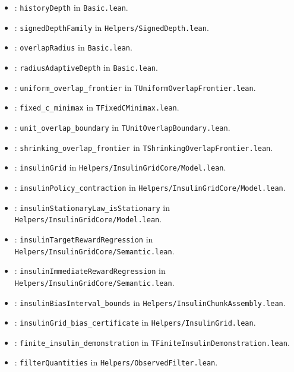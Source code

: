 \documentclass[11pt]{article}
\begin{document}
\begin{itemize}
\item {}: \texttt{historyDepth} in \texttt{Basic.lean}.
\item {}: \texttt{signedDepthFamily} in \texttt{Helpers/SignedDepth.lean}.
\item {}: \texttt{overlapRadius} in \texttt{Basic.lean}.
\item {}: \texttt{radiusAdaptiveDepth} in \texttt{Basic.lean}.
\item {}: \texttt{uniform\_overlap\_frontier} in \texttt{TUniformOverlapFrontier.lean}.
\item {}: \texttt{fixed\_c\_minimax} in \texttt{TFixedCMinimax.lean}.
\item {}: \texttt{unit\_overlap\_boundary} in \texttt{TUnitOverlapBoundary.lean}.
\item {}: \texttt{shrinking\_overlap\_frontier} in \texttt{TShrinkingOverlapFrontier.lean}.
\item {}: \texttt{insulinGrid} in \texttt{Helpers/InsulinGridCore/Model.lean}.
\item {}: \texttt{insulinPolicy\_contraction} in \texttt{Helpers/InsulinGridCore/Model.lean}.
\item {}: \texttt{insulinStationaryLaw\_isStationary} in \texttt{Helpers/InsulinGridCore/Model.lean}.
\item {}: \texttt{insulinTargetRewardRegression} in \texttt{Helpers/InsulinGridCore/Semantic.lean}.
\item {}: \texttt{insulinImmediateRewardRegression} in \texttt{Helpers/InsulinGridCore/Semantic.lean}.
\item {}: \texttt{insulinBiasInterval\_bounds} in \texttt{Helpers/InsulinChunkAssembly.lean}.
\item {}: \texttt{insulinGrid\_bias\_certificate} in \texttt{Helpers/InsulinGrid.lean}.
\item {}: \texttt{finite\_insulin\_demonstration} in \texttt{TFiniteInsulinDemonstration.lean}.
\item {}: \texttt{filterQuantities} in \texttt{Helpers/ObservedFilter.lean}.

\end{itemize}
\end{document}
